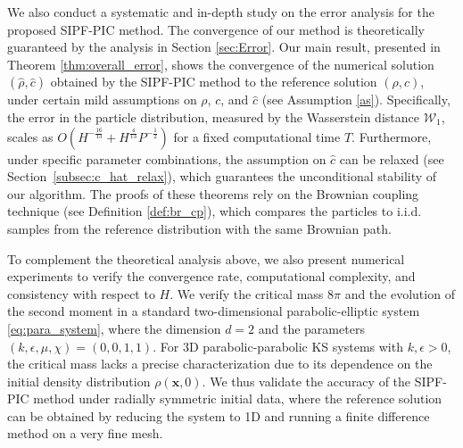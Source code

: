 \documentclass[review,onefignum,onetabnum]{siamart250211}
\begin{document}
We also conduct a systematic and in-depth study on the error analysis for the proposed SIPF-PIC method. The convergence of our method is theoretically guaranteed by the analysis in Section \ref{sec:Error}. Our main result, presented in Theorem \ref{thm:overall_error}, shows the convergence of the numerical solution \((\hat{\rho},\hat{c})\) obtained by the SIPF-PIC method to the reference solution \((\rho,c)\), under certain mild assumptions on $\rho$, $c$, and $\hat{c}$ (see Assumption \ref{as}). Specifically, the error in the particle distribution, measured by the Wasserstein distance \( \mathcal{W}_1 \), scales as \(O\left(H^{-\frac{16}{13}} + H^{\frac{4}{13}}P^{-\frac{1}{2}}\right)\) for a fixed computational time $T$. Furthermore, under specific parameter combinations, the assumption on \(\hat{c}\) can be relaxed (see Section~\ref{subsec:c_hat_relax}), which guarantees the unconditional stability of our algorithm. The proofs of these theorems rely on the Brownian coupling technique (see Definition \ref{def:br_cp}), which compares the particles to i.i.d. samples from the reference distribution with the same Brownian path.

To complement the theoretical analysis above, we also present numerical experiments to verify the convergence rate, computational complexity, and consistency with respect to $H$. We verify the critical mass \(8 \pi\) and the evolution of the second moment in a standard two-dimensional parabolic-elliptic system \eqref{eq:para_system}, where the dimension \(d=2\) and the parameters \((k, \epsilon, \mu, \chi) = (0, 0, 1, 1)\). For 3D parabolic-parabolic KS systems with \(k,\epsilon>0\), the critical mass lacks a precise characterization due to its dependence on the initial density distribution \(\rho(\mathbf{x}, 0)\). We thus validate the accuracy of the SIPF-PIC method under radially symmetric initial data, where the reference solution can be obtained by reducing the system to 1D and running a finite difference method on a very fine mesh.
\end{document}
